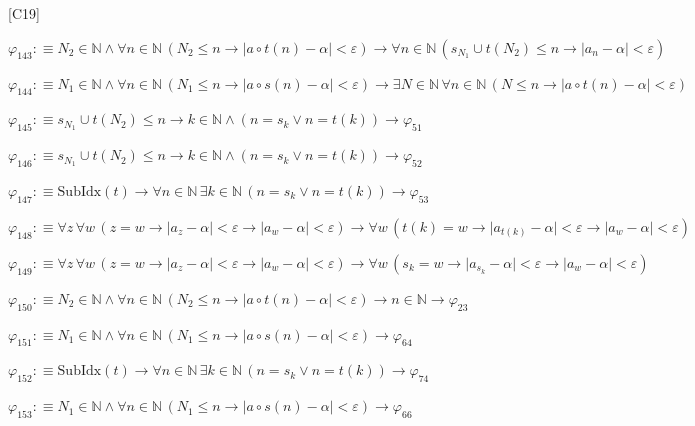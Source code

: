 \begin{fullproof}{[C19]}
\begin{abbrevlist}
\item $\varphi_{143} :\equiv N_{2} \in \mathbb{N} \land \forall n \in \mathbb{N}\,(N_{2} \leq n \to \lvert a \circ t(n) - \alpha \rvert < \varepsilon) \to \forall n \in \mathbb{N}\,(s_{N_{1}} \cup t(N_{2}) \leq n \to \lvert a_{n} - \alpha \rvert < \varepsilon)$
\item $\varphi_{144} :\equiv N_{1} \in \mathbb{N} \land \forall n \in \mathbb{N}\,(N_{1} \leq n \to \lvert a \circ s(n) - \alpha \rvert < \varepsilon) \to \exists N \in \mathbb{N}\,\forall n \in \mathbb{N}\,(N \leq n \to \lvert a \circ t(n) - \alpha \rvert < \varepsilon)$
\item $\varphi_{145} :\equiv s_{N_{1}} \cup t(N_{2}) \leq n \to k \in \mathbb{N} \land (n = s_{k} \lor n = t(k)) \to \varphi_{51}$
\item $\varphi_{146} :\equiv s_{N_{1}} \cup t(N_{2}) \leq n \to k \in \mathbb{N} \land (n = s_{k} \lor n = t(k)) \to \varphi_{52}$
\item $\varphi_{147} :\equiv \mathrm{SubIdx}(t) \to \forall n \in \mathbb{N}\,\exists k \in \mathbb{N}\,(n = s_{k} \lor n = t(k)) \to \varphi_{53}$
\item $\varphi_{148} :\equiv \forall z\,\forall w\,(z = w \to \lvert a_{z} - \alpha \rvert < \varepsilon \to \lvert a_{w} - \alpha \rvert < \varepsilon) \to \forall w\,(t(k) = w \to \lvert a_{t(k)} - \alpha \rvert < \varepsilon \to \lvert a_{w} - \alpha \rvert < \varepsilon)$
\item $\varphi_{149} :\equiv \forall z\,\forall w\,(z = w \to \lvert a_{z} - \alpha \rvert < \varepsilon \to \lvert a_{w} - \alpha \rvert < \varepsilon) \to \forall w\,(s_{k} = w \to \lvert a_{s_{k}} - \alpha \rvert < \varepsilon \to \lvert a_{w} - \alpha \rvert < \varepsilon)$
\item $\varphi_{150} :\equiv N_{2} \in \mathbb{N} \land \forall n \in \mathbb{N}\,(N_{2} \leq n \to \lvert a \circ t(n) - \alpha \rvert < \varepsilon) \to n \in \mathbb{N} \to \varphi_{23}$
\item $\varphi_{151} :\equiv N_{1} \in \mathbb{N} \land \forall n \in \mathbb{N}\,(N_{1} \leq n \to \lvert a \circ s(n) - \alpha \rvert < \varepsilon) \to \varphi_{64}$
\item $\varphi_{152} :\equiv \mathrm{SubIdx}(t) \to \forall n \in \mathbb{N}\,\exists k \in \mathbb{N}\,(n = s_{k} \lor n = t(k)) \to \varphi_{74}$
\item $\varphi_{153} :\equiv N_{1} \in \mathbb{N} \land \forall n \in \mathbb{N}\,(N_{1} \leq n \to \lvert a \circ s(n) - \alpha \rvert < \varepsilon) \to \varphi_{66}$

\end{abbrevlist}
\end{fullproof}
